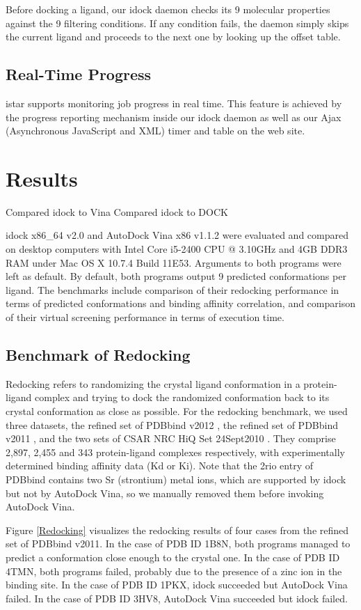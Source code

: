\documentclass[10pt]{article}
\begin{document}
Before docking a ligand, our idock daemon checks its 9 molecular properties against the 9 filtering conditions. If any condition fails, the daemon simply skips the current ligand and proceeds to the next one by looking up the offset table.

\subsection*{Real-Time Progress}
istar supports monitoring job progress in real time. This feature is achieved by the progress reporting mechanism inside our idock daemon as well as our Ajax (Asynchronous JavaScript and XML) timer and table on the web site.

\section*{Results}
Compared idock to Vina
Compared idock to DOCK

idock x86\_64 v2.0 and AutoDock Vina x86 v1.1.2 were evaluated and compared on desktop computers with Intel Core i5-2400 CPU @ 3.10GHz and 4GB DDR3 RAM under Mac OS X 10.7.4 Build 11E53. Arguments to both programs were left as default. By default, both programs output 9 predicted conformations per ligand. The benchmarks include comparison of their redocking performance in terms of predicted conformations and binding affinity correlation, and comparison of their virtual screening performance in terms of execution time.

\subsection*{Benchmark of Redocking}
Redocking refers to randomizing the crystal ligand conformation in a protein-ligand complex and trying to dock the randomized conformation back to its crystal conformation as close as possible. For the redocking benchmark, we used three datasets, the refined set of PDBbind v2012 \cite{529,530}, the refined set of PDBbind v2011 \cite{529,530}, and the two sets of CSAR NRC HiQ Set 24Sept2010 \cite{857,960}. They comprise 2,897, 2,455 and 343 protein-ligand complexes respectively, with experimentally determined binding affinity data (Kd or Ki). Note that the 2rio entry of PDBbind contains two Sr (strontium) metal ions, which are supported by idock but not by AutoDock Vina, so we manually removed them before invoking AutoDock Vina.

Figure \ref{Redocking} visualizes the redocking results of four cases from the refined set of PDBbind v2011. In the case of PDB ID 1B8N, both programs managed to predict a conformation close enough to the crystal one. In the case of PDB ID 4TMN, both programs failed, probably due to the presence of a zinc ion in the binding site. In the case of PDB ID 1PKX, idock succeeded but AutoDock Vina failed. In the case of PDB ID 3HV8, AutoDock Vina succeeded but idock failed.
\end{document}
